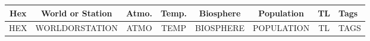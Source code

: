 \documentclass[10pt,letterpaper]{article}
\begin{document}
\begin{tabularx}{\textwidth}{ | c | c | c c c c c X |}
    \hline
    Hex & World or Station & Atmo. & Temp. & Biosphere & Population & TL & Tags \\
    \hline
    HEX & WORLDORSTATION & ATMO & TEMP & BIOSPHERE & POPULATION & TL & TAGS \\
    \hline
\end{tabularx}
\end{document}

